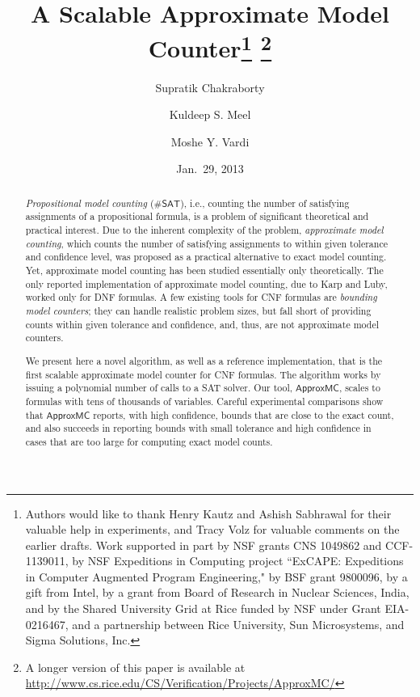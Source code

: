 \documentclass{llncs}
\newcommand{\sharpSAT}{\ensuremath{\#\mathsf{SAT}}}
\newcommand{\approxMC}{\ensuremath{\mathsf{ApproxMC}}}
\begin{document}
\makeatletter
\renewcommand*{\@fnsymbol}[1]{\ensuremath{\ifcase#1\or *\or \dagger\or \ddagger\or
   \mathsection\or \mathparagraph\or \|\or **\or \dagger\dagger
   \or \ddagger\ddagger \else\@ctrerr\fi}}
\makeatother
\title{A Scalable Approximate Model Counter\thanks{Authors would like to thank Henry Kautz and  Ashish Sabhrawal for their valuable help in experiments, and  Tracy Volz for valuable comments on the earlier drafts.  Work supported in part by NSF grants CNS 1049862 and CCF-1139011,
by NSF Expeditions in Computing project ``ExCAPE: Expeditions in Computer
Augmented Program Engineering," by BSF grant 9800096, by a gift from
Intel, by a grant from Board of Research in Nuclear Sciences, India, and by the Shared University Grid at Rice funded by NSF under Grant EIA-0216467, and a partnership between Rice University, Sun Microsystems, and Sigma Solutions, Inc.
} \thanks{A longer version of this paper is available at \url{http://www.cs.rice.edu/CS/Verification/Projects/ApproxMC/}}}
\author{Supratik Chakraborty \and Kuldeep S. Meel \and Moshe Y. Vardi}
\date{Jan.~29, 2013}

\maketitle
\begin{abstract}
\emph{Propositional model counting} ({\sharpSAT}), i.e., counting the
number of satisfying assignments of a propositional formula, is a
problem of significant theoretical and practical interest.  Due to the
inherent complexity of the problem, \emph{approximate model counting},
which counts the number of satisfying assignments to within given
tolerance and confidence level, was proposed as a practical
alternative to exact model counting. Yet, approximate model counting
has been studied essentially only theoretically.  The only reported
implementation of approximate model counting, due to Karp and Luby,
worked only for DNF formulas.  A few existing tools for CNF formulas
are \emph{bounding model counters}; they can handle realistic problem
sizes, but fall short of providing counts within given tolerance and
confidence, and, thus, are not approximate model counters.

We present here a novel algorithm, as well as a reference implementation,
that is the first scalable approximate model counter for CNF formulas.
The algorithm works by issuing a polynomial number of calls to a
SAT solver. Our tool, {\approxMC}, scales to formulas with tens of thousands of 
variables.  Careful experimental comparisons show that {\approxMC}
reports, with high confidence, bounds that are close to the exact count,
and also succeeds in reporting bounds with small tolerance
and high confidence in cases that are too large for computing exact
model counts.
\end{abstract}









\clearpage

  
\clearpage
%
\end{document}
